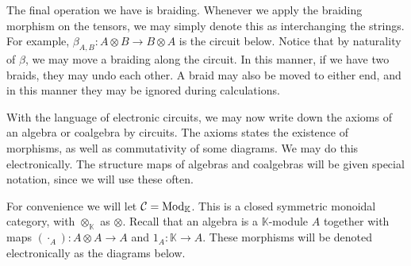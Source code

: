\documentclass[../thesis.tex]{subfiles}
\begin{document}
            The final operation we have is braiding. Whenever we apply the braiding morphism on the tensors, we may simply denote this as interchanging the strings. For example, $\beta_{A,B} : A \otimes B \rightarrow B \otimes A$ is the circuit below. Notice that by naturality of $\beta$, we may move a braiding along the circuit. In this manner, if we have two braids, they may undo each other. A braid may also be moved to either end, and in this manner they may be ignored during calculations.
            \begin{center}
            \end{center}

            With the language of electronic circuits, we may now write down the axioms of an algebra or coalgebra by circuits. The axioms states the existence of morphisms, as well as commutativity of some diagrams. We may do this electronically. The structure maps of algebras and coalgebras will be given special notation, since we will use these often.

            For convenience we will let $\mathcal{C} = \tt{Mod}_\mathbb{K}$. This is a closed symmetric monoidal category, with $\otimes_\mathbb{K}$ as $\otimes$. Recall that an algebra is a $\mathbb{K}$-module $A$ together with maps $(\cdot_A) : A \otimes A \rightarrow A$ and $1_A : \mathbb{K} \rightarrow A$. These morphisms will be denoted electronically as the diagrams below.
            \begin{center}
                \qquad
            \end{center}
\end{document}
